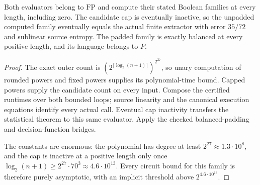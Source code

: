 \begin{theorem}
  \label{thm:lowerbounds-algebraic-uniform-hard-family}
  \leanok
  Both evaluators belong to $\mathrm{FP}$ and compute their stated
  Boolean families at every length, including zero. The candidate cap
  is eventually inactive, so the unpadded computed family eventually
  equals the actual finite extractor with error $35/72$ and sublinear
  source entropy. The padded family is exactly balanced at every
  positive length, and its language belongs to $P$.
\end{theorem}
\begin{proof}
  \leanok
  The exact outer count is
  $(2^{\lceil\log_2(n+1)\rceil})^{2^{27}}$, so unary computation of
  rounded powers and fixed powers supplies its polynomial-time bound.
  Capped powers supply the candidate count on every input. Compose
  the certified runtimes over both bounded loops; source linearity and
  the canonical execution equations identify every actual call.
  Eventual cap inactivity transfers the statistical theorem to this
  same evaluator. Apply the checked balanced-padding and decision-function
  bridges.

  The constants are enormous: the polynomial has degree at least
  $2^{27}\approx 1.3\cdot 10^{8}$, and the cap is inactive at a positive
  length only once $\log_2(n+1)\ge 2^{27}\cdot 70^{3}\approx 4.6\cdot 10^{13}$.
  Every circuit bound for this family is therefore purely asymptotic, with
  an implicit threshold above $2^{4.6\cdot 10^{13}}$.
\end{proof}

